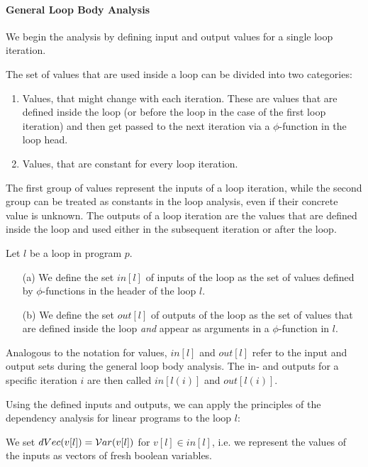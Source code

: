 \paragraph{General Loop Body Analysis}
We begin the analysis by defining input and output values for a single loop iteration. 

The set of values that are used inside a loop can be divided into two categories:
\begin{enumerate}
    \item Values, that might change with each iteration. These are values that are defined inside the loop (or before the loop in the case of the first loop iteration) and then get passed to the next iteration via a $\phi$-function in the loop head.
    \item Values, that are constant for every loop iteration.
\end{enumerate}

The first group of values represent the inputs of a loop iteration, while the second group can be treated as constants in the loop analysis, even if their concrete value is unknown. The outputs of a loop iteration are the values that are defined inside the loop and used either in the subsequent iteration or after the loop.

\begin{definition}
    Let $l$ be a loop in program $p$.
    \begin{itemize}
        \item[(a)] We define the set $in[l]$ of inputs of the loop as the set of values defined by $\phi$-functions in the header of the loop $l$.
        \item[(b)] We define the set $out[l]$ of outputs of the loop as the set of values that are defined inside the loop \emph{and} appear as arguments in a $\phi$-function in $l$.
    \end{itemize}
\end{definition}

Analogous to the notation for values, $in[l]$ and $out[l]$ refer to the input and output sets during the general loop body analysis. The in- and outputs for a specific iteration $i$ are then called $in[l(i)]$ and $out[l(i)]$.

Using the defined inputs and outputs, we can apply the principles of the dependency analysis for linear programs to the loop $l$:

We set $dVec(v[l]) = \mathcal{V}ar(v[l])$ for $v[l] \in in[l]$, i.e. we represent the values of the inputs as vectors of fresh boolean variables.

